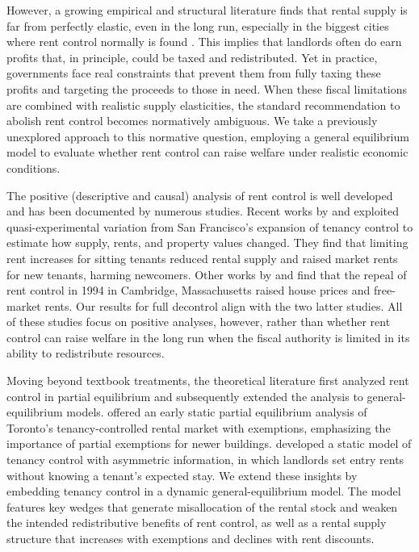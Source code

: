 \documentclass[parskip=full]{article}
\begin{document}
However, a growing empirical and structural literature finds that rental supply is far from perfectly elastic, even in the long run, especially in the biggest cities where rent control normally is found \citep{orr-1968,cy-1994,susin-2002,fack-2006,sy-2020,rs-2023}. This implies that landlords often do earn profits that, in principle, could be taxed and redistributed. Yet in practice, governments face real constraints that prevent them from fully taxing these profits and targeting the proceeds to those in need. When these fiscal limitations are combined with realistic supply elasticities, the standard recommendation to abolish rent control becomes normatively ambiguous. We take a previously unexplored approach to this normative question, employing a general equilibrium model to evaluate whether rent control can raise welfare under realistic economic conditions.

The positive (descriptive and causal) analysis of rent control is well developed and has been documented by numerous studies. Recent works by \citet{diamond-2019} and \citet{dmq-2019} exploited quasi-experimental variation from San Francisco’s expansion of tenancy control to estimate how supply, rents, and property values changed. They find that limiting rent increases for sitting tenants reduced rental supply and raised market rents for new tenants, harming newcomers. Other works by \citet{sims-2007} and \citet{app-2014} find that the repeal of rent control in 1994 in Cambridge, Massachusetts raised house prices and free-market rents. Our results for full decontrol align with the two latter studies. All of these studies focus on positive analyses, however, rather than whether rent control can raise welfare in the long run when the fiscal authority is limited in its ability to redistribute resources.

Moving beyond textbook treatments, the theoretical literature first analyzed rent control in partial equilibrium and subsequently extended the analysis to general-equilibrium models. \citet{fallis-1985} offered an early static partial equilibrium analysis of Toronto’s tenancy-controlled rental market with exemptions, emphasizing the importance of partial exemptions for newer buildings. \citet{be-2000} developed a static model of tenancy control with asymmetric information, in which landlords set entry rents without knowing a tenant’s expected stay. We extend these insights by embedding tenancy control in a dynamic general-equilibrium model. The model features key wedges that generate misallocation of the rental stock and weaken the intended redistributive benefits of rent control, as well as a rental supply structure that increases with exemptions and declines with rent discounts.
\end{document}
